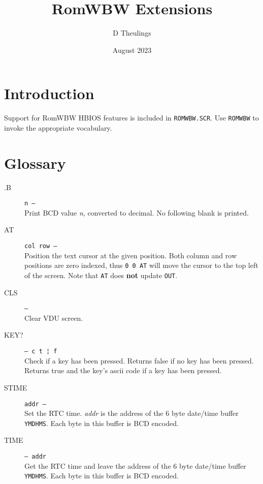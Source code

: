\documentclass{article}
\title{RomWBW Extensions}
\author{D Theulings}
\date{August 2023}
\newcommand{\n}{\textit{n}}
\begin{document}
\maketitle
\begin{multicols}{2}[]
	\setlength{\parskip}{.5em}
	\setlength\parindent{0pt}

	\section{Introduction}
	Support for RomWBW HBIOS features\footnotemark{} is included in \verb|ROMWBW.SCR|.
	Use \verb|ROMWBW| to invoke the	appropriate vocabulary.

	\section{Glossary}
	\begin{description}
		\item[.B]\texttt{n --}\\
			Print BCD value \n{}, converted to decimal. No following blank is printed.

		\item[AT]\texttt{col row ---}\\
			Position the text cursor at the given position. Both column and
			row positions are zero indexed, thus \verb|0 0 AT| will move the
			cursor to the top left of the screen. Note that \verb|AT| does
			\textbf{not} update \verb|OUT|.

		\item[CLS]\texttt{---}\\
			Clear VDU screen.

		\item[KEY?]\texttt{--- c t ¦ f}\\
			Check if a key has been pressed. Returns false if no key has been
			pressed. Returns true and the key's ascii code if a key has been
			pressed.

		\item[STIME]\texttt{addr ---}\\
			Set the RTC time. \textit{addr} is the address of the 6 byte
			date/time buffer \verb|YMDHMS|. Each byte in this buffer is BCD
			encoded.

		\item[TIME]\texttt{--- addr}\\
			Get the RTC time and leave the address of the 6 byte date/time
			buffer \verb|YMDHMS|. Each byte in this buffer is BCD encoded.
	\end{description}

\end{multicols}
\end{document}
